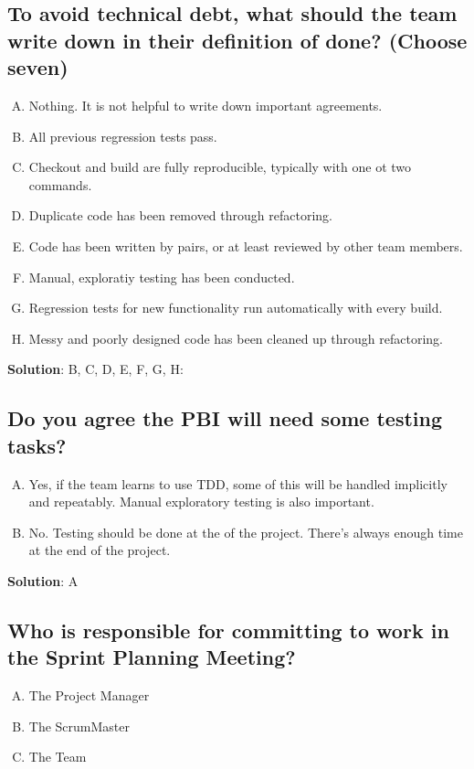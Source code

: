 \subsection{To avoid technical debt, what should the team write down in their definition of done? (Choose seven)}
\begin{enumerate}[A)]
  \item Nothing. It is not helpful to write down important agreements.
  \item All previous regression tests pass.
  \item Checkout and build are fully reproducible, typically with one ot two commands.
  \item Duplicate code has been removed through refactoring.
  \item Code has been written by pairs, or at least reviewed by other team members.
  \item Manual, exploratiy testing has been conducted.
  \item Regression tests for new functionality run automatically with every build.
  \item Messy and poorly designed code has been cleaned up through refactoring.
\end{enumerate}


\textbf{Solution}: B, C, D, E, F, G, H:


\subsection{Do you agree the PBI will need some testing tasks?}
\begin{enumerate}[A)]
  \item Yes, if the team learns to use TDD, some of this will be handled implicitly and repeatably. Manual exploratory testing is also important.
  \item No. Testing should be done at the of the project. There's always enough time at the end of the project.
\end{enumerate}


\textbf{Solution}: A


\subsection{Who is responsible for committing to work in the Sprint Planning Meeting?}
\begin{enumerate}[A)]
  \item The Project Manager
  \item The ScrumMaster
  \item The Team
\end{enumerate}


